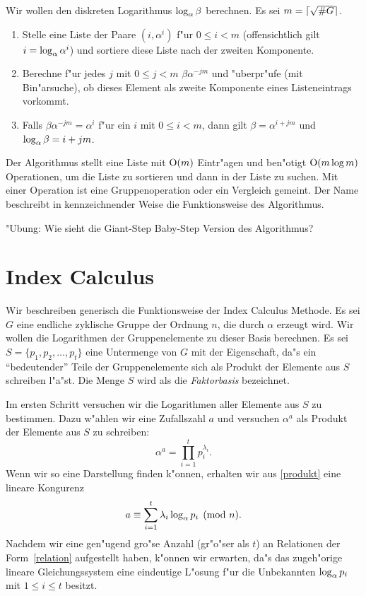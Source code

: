 Wir wollen den diskreten Logarithmus $\log_{\alpha} \beta$ berechnen.
Es sei $m=\lceil \sqrt{\#G} \rceil$.
\begin{enumerate}
  \item Stelle eine Liste der Paare $(i,\alpha^i)$ f"ur $0\le i < m$
    (offensichtlich gilt $i=\log_{\alpha} \alpha^i$) und sortiere
    diese Liste nach der zweiten Komponente.
  \item Berechne f"ur jedes $j$ mit $0 \le j < m$ $\beta \alpha^{-j m}$ und
    "uberpr"ufe (mit Bin"arsuche), ob dieses Element als zweite 
    Komponente eines Listeneintrags vorkommt.
  \item Falls $\beta\alpha^{-jm} = \alpha^i$ f"ur ein $i$ mit $0 \le i < m$,
    dann gilt $\beta = \alpha^{i+jm}$ und $\log_{\alpha} \beta = i + j m$. 
\end{enumerate}
Der Algorithmus stellt eine Liste mit $\mbox{{\cal O}}(m)$ Eintr"agen und 
ben"otigt $\mbox{{\cal O}}(m \log m)$ Operationen, um die Liste zu sortieren
und dann in der Liste zu suchen. Mit einer Operation ist
eine Gruppenoperation oder ein Vergleich gemeint. Der Name beschreibt in
kennzeichnender Weise die Funktionsweise des Algorithmus.

"Ubung: Wie sieht die Giant-Step Baby-Step Version des Algorithmus?

\section{Index Calculus}

Wir beschreiben generisch die Funktionsweise der Index Calculus Methode.
Es sei $G$ eine endliche zyklische Gruppe der Ordnung $n$, die durch
$\alpha$ erzeugt wird. Wir wollen die Logarithmen der Gruppenelemente zu
dieser Basis berechnen. Es sei $S=\{p_1, p_2, \ldots, p_t\}$ eine
Untermenge von $G$ mit der Eigenschaft, da"s ein "`bedeutender"' Teile
der Gruppenelemente sich als Produkt der Elemente aus $S$ schreiben l"a"st.
Die Menge $S$ wird als die {\em Faktorbasis} bezeichnet.

Im ersten Schritt versuchen wir die Logarithmen aller Elemente aus $S$
zu bestimmen. Dazu w"ahlen wir eine Zufallszahl $a$ und versuchen $\alpha^a$
als Produkt der Elemente aus $S$ zu schreiben:
\begin{equation}
  \alpha^a = \prod_{i=1}^t p_i^{\lambda_i}.\label{produkt}
\end{equation}
Wenn wir so eine Darstellung finden k"onnen, erhalten wir aus \ref{produkt}
eine lineare Kongurenz
\begin{equation}
  a \equiv \sum_{i=1}^t \lambda_i \log_{\alpha} p_i \pmod{n}.\label{relation}
\end{equation}
Nachdem wir eine gen"ugend gro"se Anzahl (gr"o"ser als $t$) an Relationen
der Form~\ref{relation} aufgestellt haben, k"onnen wir erwarten, da"s das 
zugeh"orige lineare
Gleichungssystem eine eindeutige L"osung f"ur die Unbekannten 
$\log_{\alpha} p_i$ mit $1 \le i \le t$ besitzt.

